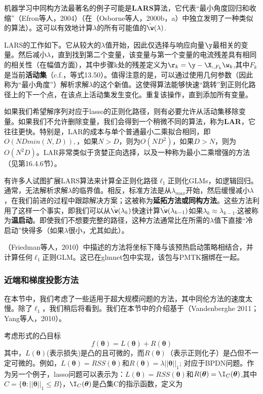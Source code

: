 \documentclass[a4paper]{article}
\begin{document}
机器学习中同构方法最著名的例子可能是\textbf{LARS}算法，它代表“最小角度回归和收缩”（Efron等人，2004）（在（Osborne等人，2000b，a）中独立发明了一种类似的算法）。这可以有效地计算$\lambda$的所有可能值的$\hat{\w}(\lambda)$.

LARS的工作如下。它从较大的$\lambda$值开始，因此仅选择与响应向量$\y$最相关的变量。然后减小$\lambda$，直到找到第二个变量，该变量与第一个变量的电流残差具有相同的相关性（在幅值方面），其中步骤k处的残差定义为$\r_k=\y-\X_{:,F_k}\w_k$,其中$F_k$是当前\textbf{活动集}（c.f.，等式13.50）。值得注意的是，可以通过使用几何参数（因此称为“最小角度”）解析求解$\lambda$的这个新值。这使得算法能够快速“跳转”到正则化路径上的下一个点，在该点上活动集发生变化。重复该操作，直到添加所有变量。

如果我们希望解序列对应于lasso的正则化路径，则有必要允许从活动集移除变量。如果我们不允许删除变量，我们会得到一个稍微不同的算法，称为\textbf{LAR}，它往往更快。特别是，LAR的成本与单个普通最小二乘拟合相同，即$O(NDmin(N,D)),$，如果$N>D$，则为$O(ND^2)$，如果$D>N$，则为$O(N^2D)$。LAR非常类似于贪婪正向选择，以及一种称为最小二乘增强的方法（见第16.4.6节）。

有许多人试图扩展LARS算法来计算全正则化路径$\ell_1$正则化GLMs，如逻辑回归。通常，无法解析求解$\lambda$的临界值。相反，标准方法是从$\lambda_{max}$开始，然后缓慢减小$\lambda$，在我们前进的过程中跟踪解决方案；这被称为\textbf{延拓方法或同构方法}。这些方法利用了这样一个事实，即我们可以从$\hat{\w}(\lambda_{k})$快速计算$\hat{\w}(\lambda_{k-1})$如果$\lambda_{k}\approx \lambda_{k-1}$.这被称为\textbf{温启动}。即使我们不想要完整的路径，这种方法通常比在所需的$\lambda$值下直接“冷启动”快得多（如果$\lambda$很小，尤其如此）。

（Friedman等人，2010）中描述的方法将坐标下降与该预热启动策略相结合，并计算任何$\ell_1$正则GLM。这已在glmnet包中实现，该包与PMTK捆绑在一起。

\subsubsection{近端和梯度投影方法}
在本节中，我们考虑了一些适用于超大规模问题的方法，其中同伦方法的速度太慢。除了$\ell_1$，我们稍后将看到。我们在本节中的介绍基于（Vandenberghe 2011；Yang等人，2010）。

考虑形式的凸目标
\begin{equation}
	f(\boldsymbol{\theta})=L(\boldsymbol{\theta})+R(\boldsymbol{\theta})\tag{13.66}
\end{equation}
其中，$L(\boldsymbol{\theta})$(表示损失)是凸的且可微的，而$R(\boldsymbol{\theta})$（表示正则化子）是凸但不一定可微的。例如，$L(\boldsymbol{\theta})=RSS(\boldsymbol{\theta})$和$R(\boldsymbol{\theta})=\lambda||\boldsymbol{\theta}||_1$; 对应于BPDN问题。作为另一个例子，lasso问题可以表示为：$L(\boldsymbol{\theta})=RSS(\boldsymbol{\theta})$和$R(\boldsymbol{\theta})=\I_C(\boldsymbol{\theta})$,其中$C=\{\boldsymbol{\theta}:||\boldsymbol{\theta}||_1\le B\}$，$\I_C(\boldsymbol{\theta})$是凸集C的指示函数，定义为
\end{document}
